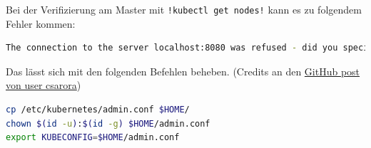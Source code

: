 Bei der Verifizierung am Master mit
\lstinline{!kubectl get nodes!} kann es zu folgendem Fehler
kommen:

\begin{lstlisting}[language=Bash]
The connection to the server localhost:8080 was refused - did you specify the right host or port?
\end{lstlisting}

Das lässt sich mit den folgenden Befehlen beheben. (Credits an den
\href{https://github.com/kubernetes/kubernetes/issues/44665\#issuecomment-295216655}{GitHub
post von user csarora})

\begin{lstlisting}[language=Bash]
cp /etc/kubernetes/admin.conf $HOME/
chown $(id -u):$(id -g) $HOME/admin.conf
export KUBECONFIG=$HOME/admin.conf
\end{lstlisting} 